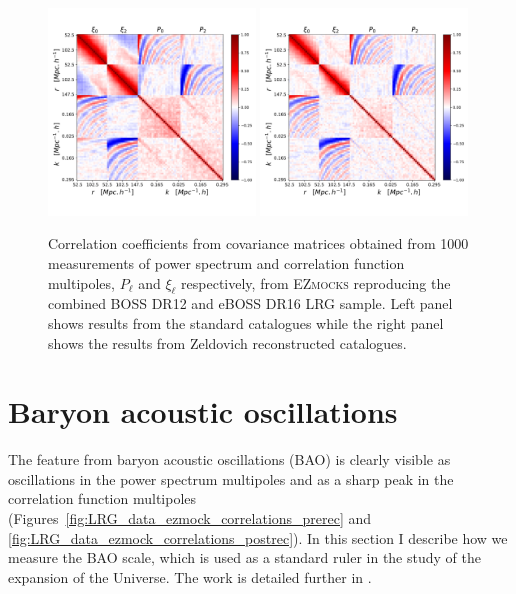 \begin{figure}
    \centering 
    \includegraphics[width=0.49\textwidth]{fig/galaxies/covariance_prerecon.pdf}
    \includegraphics[width=0.49\textwidth]{fig/galaxies/covariance.pdf}
    \caption{Correlation coefficients from covariance matrices obtained from 1000 measurements
    of power spectrum and correlation function multipoles, $P_\ell$ and $\xi_\ell$ respectively,
    from \textsc{EZmocks} reproducing the combined BOSS DR12 and eBOSS DR16 LRG sample.
    Left panel shows results from the standard catalogues while the right panel 
    shows the results from Zeldovich reconstructed catalogues. 
    }
    \label{fig:covariance_ezmock}
\end{figure}


\section{Baryon acoustic oscillations}
\label{galaxies:bao}

The feature from baryon acoustic oscillations (BAO) is clearly visible 
as oscillations in the power spectrum multipoles and as a sharp peak 
in the correlation function multipoles 
(Figures~\ref{fig:LRG_data_ezmock_correlations_prerec} and 
\ref{fig:LRG_data_ezmock_correlations_postrec}). 
In this section I describe how we measure the BAO scale, which 
is used as a standard ruler in the study of the expansion of the Universe. 
The work is detailed further in 
\cite{bautistaCompletedSDSSIVExtended2021,
gil-marinCompletedSDSSIVExtended2020}.

